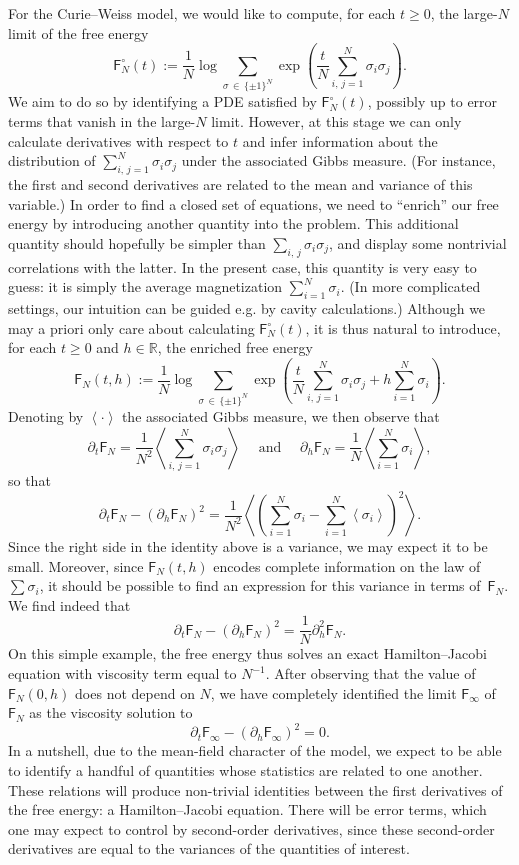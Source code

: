 \documentclass[AHL,Unicode,longabstracts,published]{cedram}
\newcommand{\R}{\mathbb{R}}
\newcommand{\sfF}{\mathsf{F}}
\newcommand{\1}{\mathds{1}}
\renewcommand{\ge}{\geqslant}
\newcommand{\la}{\left\langle}
\newcommand{\ra}{\right\rangle}
\begin{document}
For the Curie--Weiss model, we would like to compute, for each $t \ge 0$, the large-$N$ limit of the free energy
\[
\sfF_N^\circ(t) := \frac 1 N \log \sum_{\sigma\, \in\,\{\pm 1\}^N} \exp \left(\frac t N \sum_{i,\,j = 1}^N \sigma_i \sigma_j \right).
\]
We aim to do so by identifying a PDE satisfied by $\sfF_N^\circ(t)$, possibly up to error terms that vanish in the large-$N$ limit. However, at this stage we can only calculate derivatives with respect to $t$ and infer information about the distribution of $\sum_{i,\,j = 1}^N \sigma_i \sigma_j$ under the associated Gibbs measure. (For instance, the first and second derivatives are related to the mean and variance of this variable.) In order to find a closed set of equations, we need to ``enrich'' our free energy by introducing another quantity into the problem. This additional quantity should hopefully be simpler than $\sum_{i,\,j} \sigma_i \sigma_j$, and display some nontrivial correlations with the latter. In the present case, this quantity is very easy to guess: it is simply the average magnetization $\sum_{i = 1}^N \sigma_i$. (In more complicated settings, our intuition can be guided e.g. by cavity calculations.) Although we may a priori only care about calculating $\sfF_N^\circ(t)$, it is thus natural to introduce, for each $t \ge 0$ and $h \in \R$, the enriched free energy
\[
\sfF_N(t,h) := \frac 1 N \log \sum_{\sigma\,\in \,\{\pm1\}^N} \exp \left(\frac t N \sum_{i,\,j = 1}^N \sigma_i \sigma_j + h \sum_{i = 1}^N \sigma_i\right).
\]
Denoting by $\la \cdot \ra$ the associated Gibbs measure, we then observe that
\begin{equation}\label{e.also.rfcw}
\partial_t \sfF_N = \frac{1}{N^2} \la \sum_{i,\,j = 1}^N \sigma_i \sigma_j \ra \quad \text{ and } \quad
\partial_h \sfF_N = \frac{1}{N} \la \sum_{i = 1}^N \sigma_i \ra,
\end{equation}
so that
\[
\partial_t\sfF_N - \left(\partial_h \sfF_N\right)^2 = \frac 1 {N^2} \la \left(\sum_{i = 1}^N \sigma_i - \sum_{i = 1}^N\la \sigma_i \ra \right)^2 \ra.
\]
Since the right side in the identity above is a variance, we may expect it to be small. Moreover, since $\sfF_N(t,h)$ encodes complete information on the law of $\sum \sigma_i$, it should be possible to find an expression for this variance in terms of~$\sfF_N$. We find indeed that
\[
\partial_t\sfF_N - \left(\partial_h \sfF_N\right)^2 = \frac 1 N \partial_h^2 \sfF_N.
\]
On this simple example, the free energy thus solves an exact Hamilton--Jacobi equation with viscosity term equal to $N^{-1}$. After observing that the value of $\sfF_N(0,h)$ does not depend on $N$, we have completely identified the limit $\sfF_\infty$ of~$\sfF_N$ as the viscosity solution to
\[
\partial_t \sfF_\infty - \left(\partial_h \sfF_\infty\right)^2 = 0.
\]
In a nutshell, due to the mean-field character of the model, we expect to be able to identify a handful of quantities whose statistics are related to one another. These relations will produce non-trivial identities between the first derivatives of the free energy: a Hamilton--Jacobi equation. There will be error terms, which one may expect to control by second-order derivatives, since these second-order derivatives are equal to the variances of the quantities of interest.
\end{document}
